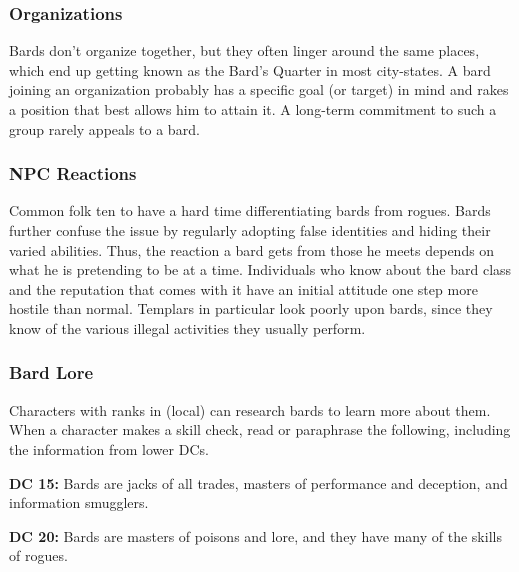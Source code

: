 \subsubsection{Organizations}
Bards don't organize together, but they often linger around the same places, which end up getting known as the Bard's Quarter in most city-states. A bard joining an organization probably has a specific goal (or target) in mind and rakes a position that best allows him to attain it. A long-term commitment to such a group rarely appeals to a bard.

\subsubsection{NPC Reactions}
Common folk ten to have a hard time differentiating bards from rogues. Bards further confuse the issue by regularly adopting false identities and hiding their varied abilities. Thus, the reaction a bard gets from those he meets depends on what he is pretending to be at a time. Individuals who know about the bard class and the reputation that comes with it have an initial attitude one step more hostile than normal. Templars in particular look poorly upon bards, since they know of the various illegal activities they usually perform.

\subsubsection{Bard Lore}
Characters with ranks in  (local) can research bards to learn more about them. When a character makes a skill check, read or paraphrase the following, including the information from lower DCs.

\textbf{DC 15:} Bards are jacks of all trades, masters of performance and deception, and information smugglers.

\textbf{DC 20:} Bards are masters of poisons and lore, and they have many of the skills of rogues.